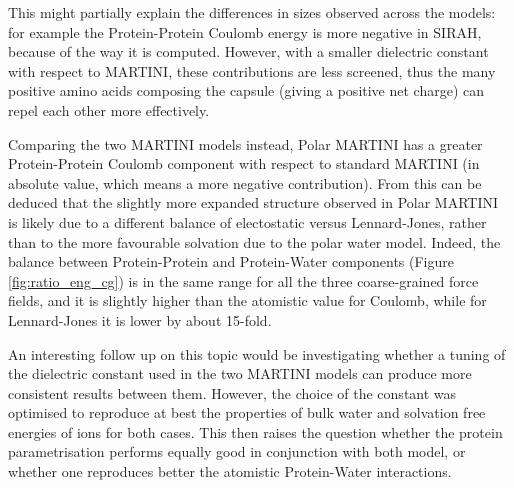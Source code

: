 This might partially explain the differences in sizes observed across the models: for example the Protein-Protein Coulomb energy is more negative in SIRAH, because of the way it is computed. However, with a smaller dielectric constant with respect to MARTINI, these contributions are less screened, thus the many positive amino acids composing the capsule (giving a positive net charge) can repel each other more effectively.

Comparing the two MARTINI models instead, Polar MARTINI has a greater Protein-Protein Coulomb component with respect to standard MARTINI (in absolute value, which means a more negative contribution). From this can be deduced that the slightly more expanded structure observed in Polar MARTINI is likely due to a different balance of electostatic versus Lennard-Jones, rather than to the more favourable solvation due to the polar water model.
%
Indeed, the balance between Protein-Protein and Protein-Water components (Figure \ref{fig:ratio_eng_cg}) is in the same range for all the three coarse-grained force fields, and it is slightly higher than the atomistic value for Coulomb, while for Lennard-Jones it is lower by about 15-fold.

An interesting follow up on this topic would be investigating whether a tuning of the dielectric constant used in the two MARTINI models can produce more consistent results between them. However, the choice of the constant was optimised to reproduce at best the properties of bulk water and solvation free energies of ions for both cases. This then raises the question whether the protein parametrisation performs equally good in conjunction with both model, or whether one reproduces better the atomistic Protein-Water interactions.



